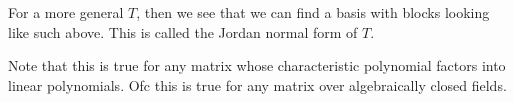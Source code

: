 \documentclass[main.tex]{subfiles}
\begin{document}
For a more general $T$, then we see that we can find a basis with blocks looking like such above. This is called the Jordan normal form of $T$.

\begin{remark}
Note that this is true for any matrix whose characteristic polynomial factors into linear polynomials. Ofc this is true for any matrix over algebraically closed fields.
\end{remark}
\end{document}
